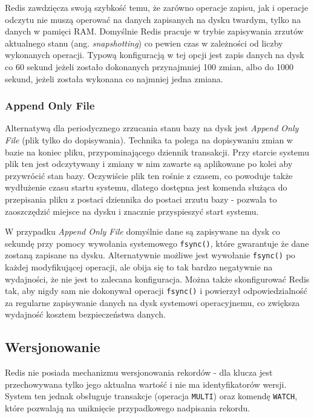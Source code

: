 Redis zawdzięcza swoją szybkość temu, że zarówno operacje zapisu, jak i operacje odczytu nie muszą operować na danych zapisanych na dysku twardym, tylko na danych w pamięci RAM.
Domyślnie Redis pracuje w trybie zapisywania zrzutów aktualnego stanu (ang. \emph{snapshotting}) co pewien czas w zależności od liczby wykonanych operacji.
Typową konfiguracją w tej opcji jest zapis danych na dysk co 60 sekund jeżeli zostało dokonanych przynajmniej 100 zmian, albo do 1000 sekund, jeżeli została wykonana co najmniej jedna zmiana.

\subsubsection*{Append Only File}

Alternatywą dla periodycznego zrzucania stanu bazy na dysk jest \emph{Append Only File} (plik tylko do dopisywania).
Technika ta polega na dopisywaniu zmian w bazie na koniec pliku, przypominającego dziennik transakcji.
Przy starcie systemu plik ten jest odczytywany i zmiany w nim zawarte są aplikowane po kolei aby przywrócić stan bazy.
Oczywiście plik ten rośnie z czasem, co powoduje także wydłużenie czasu startu systemu, dlatego dostępna jest komenda służąca do przepisania pliku z postaci dziennika do postaci zrzutu bazy - pozwala to zaoszczędzić miejsce na dysku i znacznie przyspieszyć start systemu.

W przypadku \emph{Append Only File} domyślnie dane są zapisywane na dysk co sekundę przy pomocy wywołania systemowego \verb+fsync()+, które gwarantuje że dane zostaną zapisane na dysku.
Alternatywnie możliwe jest wywołanie \verb+fsync()+ po każdej modyfikującej operacji, ale obija się to tak bardzo negatywnie na wydajności, że nie jest to zalecana konfiguracja.
Można także skonfigurować Redis tak, aby nigdy sam nie dokonywał operacji \verb+fsync()+ i powierzył odpowiedzialność za regularne zapisywanie danych na dysk systemowi operacyjnemu, co zwiększa wydajność kosztem bezpieczeństwa danych.

\subsection*{Wersjonowanie}

Redis nie posiada mechanizmu wersjonowania rekordów - dla klucza jest przechowywana tylko jego aktualna wartość i nie ma identyfikatorów wersji.
System ten jednak obsługuje transakcje (operacja \verb+MULTI+) oraz komendę \verb+WATCH+, które pozwalają na uniknięcie przypadkowego nadpisania rekordu.

